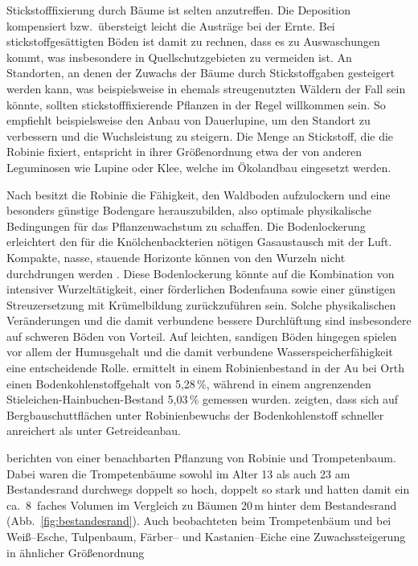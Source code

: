 \documentclass[twocolumn]{scrartcl}
\begin{document}
Stickstofffixierung durch Bäume ist selten anzutreffen.
Die Deposition kompensiert bzw.\ übersteigt leicht die Austräge bei
der Ernte. Bei stickstoffgesättigten Böden ist damit zu rechnen, dass
es zu Auswaschungen kommt, was insbesondere in Quellschutzgebieten zu
vermeiden ist. An Standorten, an denen der Zuwachs der Bäume durch
Stickstoffgaben gesteigert werden kann, was beispielsweise in ehemals
streugenutzten Wäldern der Fall sein könnte, sollten
stickstofffixierende Pflanzen in der Regel willkommen sein. So
empfiehlt beispielsweise \citet{wiedemann1951ertragskunde} den Anbau
von Dauerlupine, um den Standort zu verbessern und die Wuchsleistung zu
steigern. Die Menge an Stickstoff, die die Robinie fixiert, entspricht
in ihrer Größenordnung etwa der von anderen Leguminosen wie Lupine
oder Klee, welche im Ökolandbau eingesetzt werden.

Nach
\citet{albert1926robinieBodenlockerheit,penschuck1931robinieBodenphysik}
besitzt die Robinie die Fähigkeit, den Waldboden aufzulockern und eine
besonders günstige Bodengare herauszubilden, also optimale
physikalische Bedingungen für das Pflanzenwachstum zu schaffen.  Die
Bodenlockerung erleichtert den für die Knölchenbackterien nötigen
Gasaustausch mit der Luft.  Kompakte, nasse, stauende Horizonte können
von den Wurzeln nicht durchdrungen werden \citep{mueller1991robinie}.
Diese Bodenlockerung könnte auf die Kombination von intensiver
Wurzeltätigkeit, einer förderlichen Bodenfauna sowie einer günstigen
Streuzersetzung mit Krümelbildung zurückzuführen sein. Solche
physikalischen Veränderungen und die damit verbundene bessere
Durchlüftung sind insbesondere auf schweren Böden von Vorteil. Auf
leichten, sandigen Böden hingegen spielen vor allem der Humusgehalt
und die damit verbundene Wasserspeicherfähigkeit eine entscheidende
Rolle. \citet{kastler2013robinieBoden} ermittelt in einem
Robinienbestand in der Au bei Orth einen Bodenkohlenstoffgehalt von
5,28\,\%, während in einem angrenzenden Stieleichen-Hainbuchen-Bestand
5,03\,\% gemessen wurden. \citet{Kanzler2021robinieBodenc} zeigten,
dass sich auf Bergbauschuttflächen unter Robinienbewuchs der
Bodenkohlenstoff schneller anreichert als unter Getreideanbau.

\citet{ferguson1922robinie,mcintyre1932robinie,chapman1935robinie}
berichten von einer benachbarten Pflanzung von Robinie und
Trompetenbaum. Dabei waren die Trompetenbäume sowohl im Alter 13 als
auch 23 am Bestandesrand durchwegs doppelt so hoch, doppelt so stark
und hatten damit ein ca.\ 8~faches Volumen im Vergleich zu Bäumen
20\,m hinter dem Bestandesrand (Abb.~\ref{fig:bestandesrand}). Auch
\citet{mcintyre1932robinie} beobachteten beim Trompetenbäum und
\citet{chapman1935robinie} bei Weiß--Esche, Tulpenbaum, Färber-- und
Kastanien--Eiche eine Zuwachssteigerung in ähnlicher Größenordnung
\end{document}
